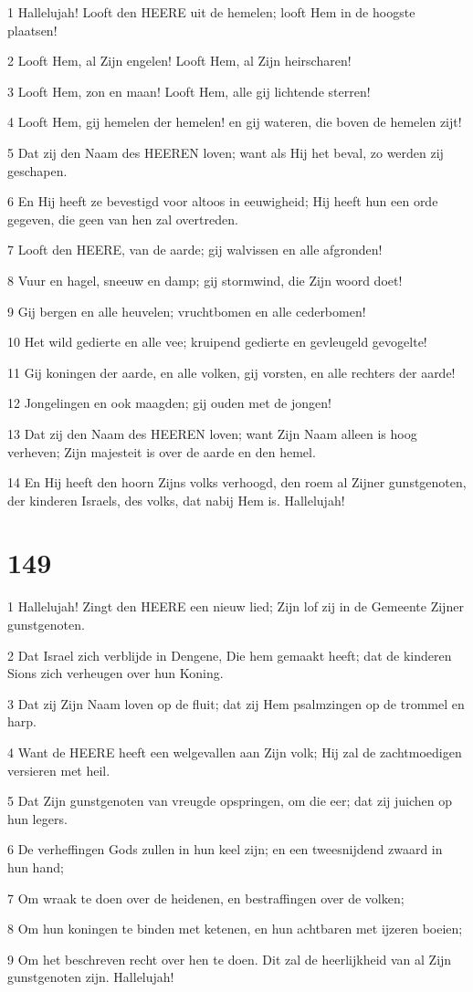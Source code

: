 \par 1 Hallelujah! Looft den HEERE uit de hemelen; looft Hem in de hoogste plaatsen!
\par 2 Looft Hem, al Zijn engelen! Looft Hem, al Zijn heirscharen!
\par 3 Looft Hem, zon en maan! Looft Hem, alle gij lichtende sterren!
\par 4 Looft Hem, gij hemelen der hemelen! en gij wateren, die boven de hemelen zijt!
\par 5 Dat zij den Naam des HEEREN loven; want als Hij het beval, zo werden zij geschapen.
\par 6 En Hij heeft ze bevestigd voor altoos in eeuwigheid; Hij heeft hun een orde gegeven, die geen van hen zal overtreden.
\par 7 Looft den HEERE, van de aarde; gij walvissen en alle afgronden!
\par 8 Vuur en hagel, sneeuw en damp; gij stormwind, die Zijn woord doet!
\par 9 Gij bergen en alle heuvelen; vruchtbomen en alle cederbomen!
\par 10 Het wild gedierte en alle vee; kruipend gedierte en gevleugeld gevogelte!
\par 11 Gij koningen der aarde, en alle volken, gij vorsten, en alle rechters der aarde!
\par 12 Jongelingen en ook maagden; gij ouden met de jongen!
\par 13 Dat zij den Naam des HEEREN loven; want Zijn Naam alleen is hoog verheven; Zijn majesteit is over de aarde en den hemel.
\par 14 En Hij heeft den hoorn Zijns volks verhoogd, den roem al Zijner gunstgenoten, der kinderen Israels, des volks, dat nabij Hem is. Hallelujah!

\chapter{149}

\par 1 Hallelujah! Zingt den HEERE een nieuw lied; Zijn lof zij in de Gemeente Zijner gunstgenoten.
\par 2 Dat Israel zich verblijde in Dengene, Die hem gemaakt heeft; dat de kinderen Sions zich verheugen over hun Koning.
\par 3 Dat zij Zijn Naam loven op de fluit; dat zij Hem psalmzingen op de trommel en harp.
\par 4 Want de HEERE heeft een welgevallen aan Zijn volk; Hij zal de zachtmoedigen versieren met heil.
\par 5 Dat Zijn gunstgenoten van vreugde opspringen, om die eer; dat zij juichen op hun legers.
\par 6 De verheffingen Gods zullen in hun keel zijn; en een tweesnijdend zwaard in hun hand;
\par 7 Om wraak te doen over de heidenen, en bestraffingen over de volken;
\par 8 Om hun koningen te binden met ketenen, en hun achtbaren met ijzeren boeien;
\par 9 Om het beschreven recht over hen te doen. Dit zal de heerlijkheid van al Zijn gunstgenoten zijn. Hallelujah!


